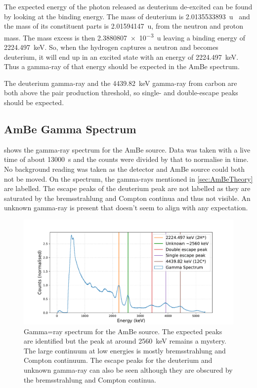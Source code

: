 \documentclass[11pt]{article}
\numberwithin{equation}{section}
\numberwithin{figure}{section}
\numberwithin{table}{section}
\begin{document}
The expected energy of the photon released as deuterium de-excited can be found by looking at the binding energy. The mass of deuterium is \SI{2.0135533893}{u}~\cite{deuterium} and the mass of its constituent parts is \SI{2.01594147}{u}, from the neutron and proton mass. The mass excess is then \SI{2.3880807e-3}{u} leaving a binding energy of \SI{2224.497}{\kilo\electronvolt}. So, when the hydrogen captures a neutron and becomes deuterium, it will end up in an excited state with an energy of \SI{2224.497}{\kilo\electronvolt}. Thus a gamma-ray of that energy should be expected in the AmBe spectrum. 

The deuterium gamma-ray and the \SI{4439.82}{\kilo\electronvolt} gamma-ray from carbon are both above the pair production threshold, so single- and double-escape peaks should be expected. 

\subsection{AmBe Gamma Spectrum}
 shows the gamma-ray spectrum for the AmBe source. Data was taken with a live time of about \SI{13000}{\second} and the counts were divided by that to normalise in time. No background reading was taken as the detector and AmBe source could both not be moved. On the spectrum, the gamma-rays mentioned in \cref{sec:AmBeTheory} are labelled. The escape peaks of the deuterium peak are not labelled as they are saturated by the bremsstrahlung and Compton continua and thus not visible. An unknown gamma-ray is present that doesn't seem to align with any expectation. 

\begin{figure}[h]
    \begin{center}
        \includegraphics[width=.8\textwidth]{Plots/ambe.pdf}
        \caption{Gamma=ray spectrum for the AmBe source. The expected peaks are identified but the peak at around \SI{2560}{\kilo\electronvolt} remains a mystery. The large continuum at low energies is mostly bremsstrahlung and Compton continuum. The escape peaks for the deuterium and unknown gamma-ray can also be seen although they are obscured by the bremsstrahlung and Compton continua.}
        \label{fig:AmBe_Spectrum}
    \end{center}
\end{figure}
\end{document}
